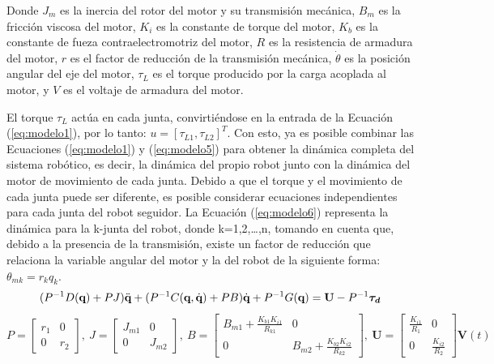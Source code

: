 Donde $ J_m $ es la inercia del rotor del motor y su transmisión mecánica, $ B_m $ es la fricción viscosa del motor, $ K_i $ es la constante de torque del motor, $ K_b $ es la constante de fueza contraelectromotriz del motor, $ R $ es la resistencia de armadura del motor, $ r $ es el factor de reducción de la transmisión mecánica, $ \Dot{\theta} $ es la posición angular del eje del motor, $ \tau_L $ es el torque producido por la carga acoplada al motor, y $ V $ es el voltaje de armadura del motor.

El torque $ \tau_L $ actúa en cada junta, convirtiéndose en la entrada de la Ecuación (\ref{eq:modelo1}), por lo tanto: $ u=[\tau_{L1},\tau_{L2}]^T $. Con esto, ya es posible combinar las Ecuaciones (\ref{eq:modelo1}) y (\ref{eq:modelo5}) para obtener la dinámica completa del sistema robótico, es decir, la dinámica del propio robot junto con la dinámica del motor de movimiento de cada junta. Debido a que el torque y el movimiento de cada junta puede ser diferente, es posible considerar ecuaciones independientes para cada junta del robot seguidor. La Ecuación (\ref{eq:modelo6}) representa la dinámica para la k-junta del robot, donde k=1,2,…,n, tomando en cuenta que, debido a la presencia de la transmisión, existe un factor de reducción que relaciona la variable angular del motor y la del robot de la siguiente forma: $ θ_{mk}=r_k q_k $.
\begin{equation} \label{eq:modelo6}
    (P^{-1} D(\textbf{q})+PJ)\Ddot{\textbf{q}} +(P^{-1} C(\textbf{q},\Dot{\textbf{q}})+PB)\Dot{\textbf{q}} +P^{-1} G(\textbf{q})=\textbf{U}-P^{-1}\bm{\tau_d}
\end{equation}
\begin{equation}
    P=
    \begin{bmatrix}
        r_1 & 0 \\
        0 & r_2 
    \end{bmatrix}
    ,\ J=
    \begin{bmatrix}
        J_{m1} & 0 \\
        0 & J_{m2}
    \end{bmatrix}
    ,\ B=
    \begin{bmatrix}
        B_{m1}+\frac{K_{b1} K_{i1}}{R_{k1}}  & 0 \\
        0 & B_{m2}+\frac{K_{b2} K_{i2}}{R_{k2}}
    \end{bmatrix}
    ,\ \textbf{U}=
    \begin{bmatrix}
        \frac{K_{i1}}{R_{1}}  & 0 \\
        0 & \frac{K_{i2}}{R_{2}}
    \end{bmatrix}
    \textbf{V}(t)
\end{equation}

